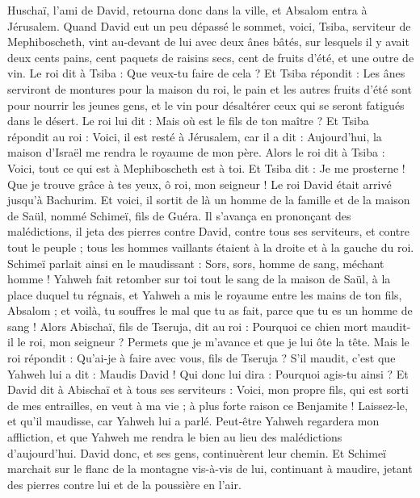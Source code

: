 \begin{multicols}{2}
Huschaï, l'ami de David, retourna donc dans la ville, et Absalom entra à Jérusalem.
\VerseOne{}Quand David eut un peu dépassé le sommet, voici, Tsiba, serviteur de Mephiboscheth, vint au-devant de lui avec deux ânes bâtés, sur lesquels il y avait deux cents pains, cent paquets de raisins secs, cent de fruits d'été, et une outre de vin.
Le roi dit à Tsiba : Que veux-tu faire de cela ? Et Tsiba répondit : Les ânes serviront de montures pour la maison du roi, le pain et les autres fruits d'été sont pour nourrir les jeunes gens, et le vin pour désaltérer ceux qui se seront fatigués dans le désert.
Le roi lui dit : Mais où est le fils de ton maître ? Et Tsiba répondit au roi : Voici, il est resté à Jérusalem, car il a dit : Aujourd'hui, la maison d'Israël me rendra le royaume de mon père.
Alors le roi dit à Tsiba : Voici, tout ce qui est à Mephiboscheth est à toi. Et Tsiba dit : Je me prosterne ! Que je trouve grâce à tes yeux, ô roi, mon seigneur !
Le roi David était arrivé jusqu'à Bachurim. Et voici, il sortit de là un homme de la famille et de la maison de Saül, nommé Schimeï, fils de Guéra. Il s'avança en prononçant des malédictions,
il jeta des pierres contre David, contre tous ses serviteurs, et contre tout le peuple ; tous les hommes vaillants étaient à la droite et à la gauche du roi.
Schimeï parlait ainsi en le maudissant : Sors, sors, homme de sang, méchant homme !
Yahweh fait retomber sur toi tout le sang de la maison de Saül, à la place duquel tu régnais, et Yahweh a mis le royaume entre les mains de ton fils, Absalom ; et voilà, tu souffres le mal que tu as fait, parce que tu es un homme de sang !
Alors Abischaï, fils de Tseruja, dit au roi : Pourquoi ce chien mort maudit-il le roi, mon seigneur ? Permets que je m'avance et que je lui ôte la tête.
Mais le roi répondit : Qu'ai-je à faire avec vous, fils de Tseruja ? S'il maudit, c'est que Yahweh lui a dit : Maudis David ! Qui donc lui dira : Pourquoi agis-tu ainsi ?
Et David dit à Abischaï et à tous ses serviteurs : Voici, mon propre fils, qui est sorti de mes entrailles, en veut à ma vie ; à plus forte raison ce Benjamite ! Laissez-le, et qu'il maudisse, car Yahweh lui a parlé.
Peut-être Yahweh regardera mon affliction, et que Yahweh me rendra le bien au lieu des malédictions d'aujourd'hui.
David donc, et ses gens, continuèrent leur chemin. Et Schimeï marchait sur le flanc de la montagne vis-à-vis de lui, continuant à maudire, jetant des pierres contre lui et de la poussière en l'air.

\end{multicols}
